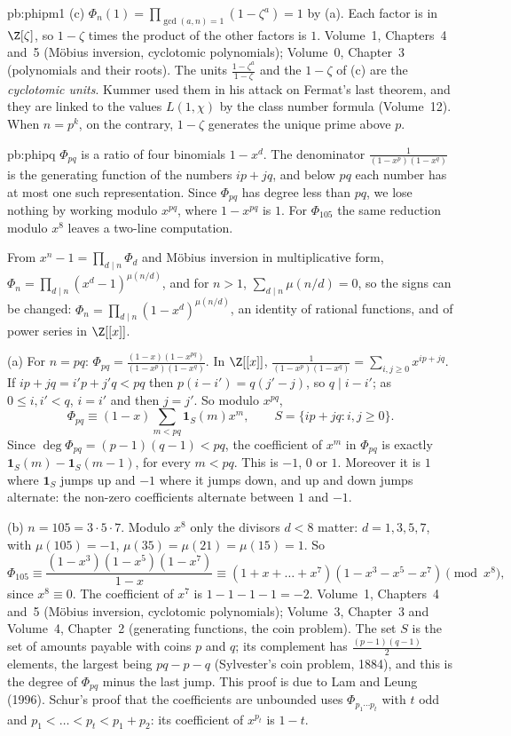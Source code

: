 \begin{solution}{pb:phipm1}
(c) $\Phi_n(1)=\prod_{\gcd(a,n)=1}(1-\zeta^a)=1$ by (a). Each factor is in $\Z[\zeta]$, so $1-\zeta$ times the product of
the other factors is $1$.
\tools Volume~1, Chapters~4 and~5 (Möbius inversion, cyclotomic polynomials); Volume~0, Chapter~3 (polynomials and their roots).
\leads The units $\frac{1-\zeta^a}{1-\zeta}$ and the $1-\zeta$ of (c) are the \emph{cyclotomic units}. Kummer used them in
his attack on Fermat's last theorem, and they are linked to the values $L(1,\chi)$ by the class number formula (Volume~12).
When $n=p^k$, on the contrary, $1-\zeta$ generates the unique prime above $p$.
\end{solution}

\begin{solution}{pb:phipq}
\idea $\Phi_{pq}$ is a ratio of four binomials $1-x^d$. The denominator $\frac1{(1-x^p)(1-x^q)}$ is the generating function
of the numbers $ip+jq$, and below $pq$ each number has at most one such representation. Since $\Phi_{pq}$ has degree less
than $pq$, we lose nothing by working modulo $x^{pq}$, where $1-x^{pq}$ is $1$. For $\Phi_{105}$ the same reduction modulo
$x^8$ leaves a two-line computation.

\writeup From $x^n-1=\prod_{d\mid n}\Phi_d$ and Möbius inversion in multiplicative form,
$\Phi_n=\prod_{d\mid n}(x^d-1)^{\mu(n/d)}$, and for $n>1$, $\sum_{d\mid n}\mu(n/d)=0$, so the signs can be changed:
$\Phi_n=\prod_{d\mid n}(1-x^d)^{\mu(n/d)}$, an identity of rational functions, and of power series in $\Z[[x]]$.

(a) For $n=pq$: $\Phi_{pq}=\frac{(1-x)(1-x^{pq})}{(1-x^p)(1-x^q)}$. In $\Z[[x]]$,
$\frac1{(1-x^p)(1-x^q)}=\sum_{i,j\ge0}x^{ip+jq}$. If $ip+jq=i'p+j'q<pq$ then $p(i-i')=q(j'-j)$, so $q\mid i-i'$; as
$0\le i,i'<q$, $i=i'$ and then $j=j'$. So modulo $x^{pq}$,
\[
\Phi_{pq}\equiv(1-x)\sum_{m<pq}\mathbf 1_S(m)x^m,\qquad S=\{ip+jq:i,j\ge0\}.
\]
Since $\deg\Phi_{pq}=(p-1)(q-1)<pq$, the coefficient of $x^m$ in $\Phi_{pq}$ is exactly $\mathbf 1_S(m)-\mathbf 1_S(m-1)$,
for every $m<pq$. This is $-1$, $0$ or $1$. Moreover it is $1$ where $\mathbf 1_S$ jumps up and $-1$ where it jumps down,
and up and down jumps alternate: the non-zero coefficients alternate between $1$ and $-1$.

(b) $n=105=3\cdot5\cdot7$. Modulo $x^8$ only the divisors $d<8$ matter: $d=1,3,5,7$, with $\mu(105)=-1$, $\mu(35)=\mu(21)=\mu(15)
=1$. So
\[
\Phi_{105}\equiv\frac{(1-x^3)(1-x^5)(1-x^7)}{1-x}\equiv(1+x+\dots+x^7)(1-x^3-x^5-x^7)\pmod{x^8},
\]
since $x^8\equiv0$. The coefficient of $x^7$ is $1-1-1-1=-2$.
\tools Volume~1, Chapters~4 and~5 (Möbius inversion, cyclotomic polynomials); Volume~3, Chapter~3 and Volume~4, Chapter~2
(generating functions, the coin problem).
\leads The set $S$ is the set of amounts payable with coins $p$ and $q$; its complement has $\frac{(p-1)(q-1)}2$ elements, the
largest being $pq-p-q$ (Sylvester's coin problem, 1884), and this is the degree of $\Phi_{pq}$ minus the last jump. This
proof is due to Lam and Leung (1996). Schur's proof that the coefficients are unbounded uses $\Phi_{p_1\cdots p_t}$ with
$t$ odd and $p_1<\dots<p_t<p_1+p_2$: its coefficient of $x^{p_t}$ is $1-t$.
\end{solution}

